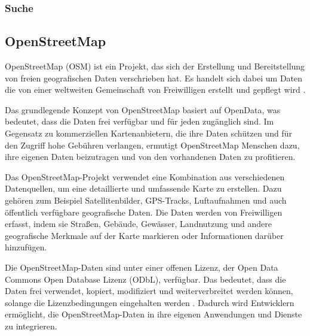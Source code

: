 \subsubsection{Suche}

\subsection{OpenStreetMap}
OpenStreetMap (OSM) ist ein Projekt, das sich der Erstellung und Bereitstellung von freien
geografischen Daten verschrieben hat. Es handelt sich dabei um Daten die von einer weltweiten
Gemeinschaft von Freiwilligen erstellt und gepflegt wird \cite{osm.about}.

Das grundlegende Konzept von OpenStreetMap basiert auf OpenData, was bedeutet, dass die Daten frei
verfügbar und für jeden zugänglich sind. Im Gegensatz zu kommerziellen Kartenanbietern, die ihre
Daten schützen und für den Zugriff hohe Gebühren verlangen, ermutigt OpenStreetMap Menschen dazu,
ihre eigenen Daten beizutragen und von den vorhandenen Daten zu profitieren.

Das OpenStreetMap-Projekt verwendet eine Kombination aus verschiedenen Datenquellen, um eine
detaillierte und umfassende Karte zu erstellen. Dazu gehören zum Beispiel Satellitenbilder,
GPS-Tracks, Luftaufnahmen und auch öffentlich verfügbare geografische Daten. Die Daten werden von
Freiwilligen erfasst, indem sie Straßen, Gebäude, Gewässer, Landnutzung und andere geografische
Merkmale auf der Karte markieren oder Informationen darüber hinzufügen.

Die OpenStreetMap-Daten sind unter einer offenen Lizenz, der Open Data Commons Open Database Lizenz
(ODbL), verfügbar. Das bedeutet, dass die Daten frei verwendet, kopiert, modifiziert und
weiterverbreitet werden können, solange die Lizenzbedingungen eingehalten werden \cite{osm.license}.
Dadurch wird Entwicklern ermöglicht, die OpenStreetMap-Daten in ihre eigenen Anwendungen und
Dienste zu integrieren.